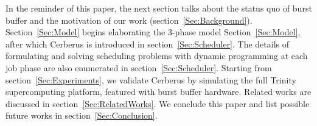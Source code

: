 In the reminder of this paper,
the next section talks about the status quo of burst buffer and
the motivation of our work (section~\ref{Sec:Background}).
Section~\ref{Sec:Model} begins elaborating the 3-phase model Section~\ref{Sec:Model},
after which Cerberus is introduced in section~\ref{Sec:Scheduler}.
The details of formulating and solving scheduling problems with
dynamic programming at each job phase are also
enumerated in section~\ref{Sec:Scheduler}.
Starting from section~\ref{Sec:Experiments}, we validate Cerberus
by simulating the full Trinity supercomputing platform, featured with
burst buffer hardware.
Related works are discussed in section~\ref{Sec:RelatedWorks}.
We conclude this paper and list possible future works in section~\ref{Sec:Conclusion}.

